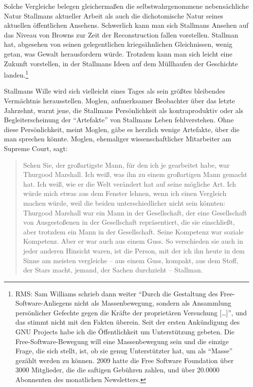 Solche Vergleiche belegen gleichermaßen die selbstwahrgenommene nebensächliche Natur Stallmans aktueller Arbeit als auch die dichotomische Natur seines aktuellen öffentlichen Ansehens. Schwerlich kann man sich Stallmans Ansehen auf das Niveau von Browns zur Zeit der Reconstruction fallen vorstellen. Stallman hat, abgesehen von seinen gelegentlichen kriegsähnlichen Gleichnissen, wenig getan, was Gewalt herausfordern würde. Trotzdem kann man sich leicht eine Zukunft vorstellen, in der Stallmans Ideen auf dem Müllhaufen der Geschichte landen.\footnote{RMS: Sam Williams schrieb dann weiter "`Durch die Gestaltung des Free-Software-Anliegens nicht als Massenbewegung, sondern als Ansammlung persönlicher Gefechte gegen die Kräfte der proprietären Versuchung [\ldots]"', und das stimmt nicht mit den Fakten überein. Seit der ersten Ankündigung des GNU Projects habe ich die Öffentlichkeit um Unterstützung gebeten. Die Free-Software-Bewegung will eine Massenbewegung sein und die einzige Frage, die sich stellt, ist, ob sie genug Unterstützter hat, um als "`Masse"' gezählt werden zu können. 2009 hatte die Free Software Foundation über 3000 Mitglieder, die die saftigen Gebühren zahlen, und über 20.0000 Abonnenten des monatlichen Newsletters.}

Stallmans Wille wird sich vielleicht eines Tages als sein größtes bleibendes Vermächtnis herausstellen. Moglen, aufmerksamer Beobachter über das letzte Jahrzehnt, warnt jene, die Stallmans Persönlichkeit als kontraproduktiv oder als Begleiterscheinung der "`Artefakte"' von Stallmans Leben fehlverstehen. Ohne diese Persönlichkeit, meint Moglen, gäbe es herzlich wenige Artefakte, über die man sprechen könnte. Moglen, ehemaliger wissenschaftlicher Mitarbeiter am Supreme Court, sagt:

\begin{quote}
Sehen Sie, der großartigste Mann, für den ich je gearbeitet habe, war Thurgood Marshall. Ich weiß, was ihn zu einem großartigen Mann gemacht hat. Ich weiß, wie er die Welt verändert hat auf seine mögliche Art. Ich würde mich etwas aus dem Fenster lehnen, wenn ich einen Vergleich machen würde, weil die beiden unterschiedlicher nicht sein könnten: Thurgood Marshall war ein Mann in der Gesellschaft, der eine Gesellschaft von Ausgestoßenen in der Gesellschaft repräsentiert, die sie einschließt, aber trotzdem ein Mann in der Gesellschaft. Seine Kompetenz war soziale Kompetenz. Aber er war auch aus einem Guss. So verschieden sie auch in jeder anderen Hinsicht waren, ist die Person, mit der ich ihn heute in dem Sinne am meisten vergleiche – aus einem Guss, kompakt, aus dem Stoff, der Stars macht, jemand, der Sachen durchzieht – Stallman.
\end{quote}

